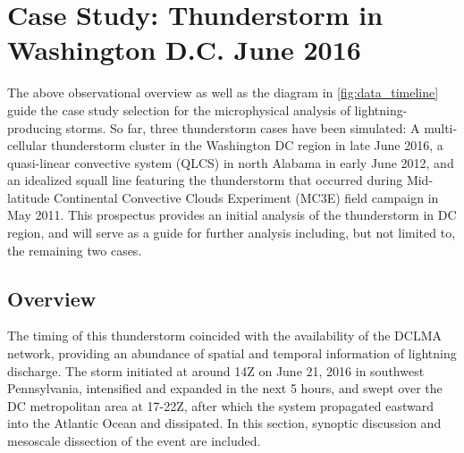  
\chapter{Case Study: Thunderstorm in Washington D.C. June 2016}
\label{chap:case}
\resetfootnote %
The above observational overview as well as the diagram in \ref{fig:data_timeline} guide the case study selection for the microphysical analysis of lightning-producing storms. So far, three thunderstorm cases have been simulated: A multi-cellular thunderstorm cluster in the Washington DC region in late June 2016, a quasi-linear convective system (QLCS) in north Alabama in early June 2012, and an idealized squall line featuring the thunderstorm that occurred during Mid-latitude Continental Convective Clouds Experiment (MC3E) field campaign in May 2011. This prospectus provides an initial analysis of the thunderstorm in DC region, and will serve as a guide for further analysis including, but not limited to, the remaining two cases.
\section{Overview}
\label{sec:case_ovv}
The timing of this thunderstorm coincided with the availability of the DCLMA network, providing an abundance of spatial and temporal information of lightning discharge. The storm initiated at around 14Z on June 21, 2016 in southwest Pennsylvania, intensified and expanded in the next 5 hours, and swept over the DC metropolitan area at 17-22Z, after which the system propagated eastward into the Atlantic Ocean and dissipated. In this section, synoptic discussion and mesoscale dissection of the event are included.

